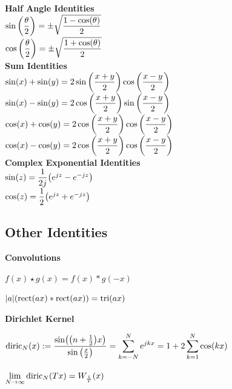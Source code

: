 \documentclass[11pt]{article}
\begin{document}
\begin{multicols}{2}
  \textbf{Half Angle Identities}\\
  \(\sin{\left( \dfrac{\theta}{2} \right)} = \pm \sqrt{\dfrac{1 - \cos(\theta)}{2}}\) \vspace{6pt}\\
  \(\cos{\left( \dfrac{\theta}{2} \right)} = \pm \sqrt{\dfrac{1 + \cos(\theta)}{2}}\) \vspace{6pt}\\

  \textbf{Sum Identities}\\
  \(\sin(x) + \sin(y) = 2\sin{\left( \dfrac{x + y}{2} \right)}\cos{\left( \dfrac{x - y}{2} \right)}\) \vspace{10pt}\\
  \(\sin(x) - \sin(y) = 2\cos{\left( \dfrac{x + y}{2} \right)}\sin{\left( \dfrac{x - y}{2} \right)}\) \vspace{10pt}\\
  \(\cos(x) + \cos(y) = 2\cos{\left( \dfrac{x + y}{2} \right)}\cos{\left( \dfrac{x - y}{2} \right)}\) \vspace{10pt}\\
  \(\cos(x) - \cos(y) = 2\cos{\left( \dfrac{x + y}{2} \right)}\cos{\left( \dfrac{x - y}{2} \right)}\) \vspace{10pt}\\
  \textbf{Complex Exponential Identities}\\
  \(\sin(z) = \dfrac{1}{2j}{\left( e^{jz} - e ^{-jz} \right)}\)\vspace{6pt}\\
  \(\cos(z) = \dfrac{1}{2}{\left( e^{jz} + e ^{-jz} \right)}\)
  \end{multicols}

  \pagebreak

  \subsection{Other Identities}


  \textbf{Convolutions}

  \(f(x) \star g(x) = f(x) * g(-x)\)

  \(|a|(\mathrm{rect}(ax) * \mathrm{rect}(ax)) = \mathrm{tri}(ax)\)

  \vspace{12pt}

  \textbf{Dirichlet Kernel}

  \(\displaystyle
  \mathrm{diric}_N(x) := \dfrac{\sin({\left( n + \frac{1}{2} \right)}x)}{\sin{\left( \frac{x}{2} \right)}} =
  \sum_{k = -N}^{N} e^{jkx} =
  1 + 2\sum_{k = 1}^N\cos(kx)\)

  \(\displaystyle \lim_{N \to \infty} \mathrm{diric}_{N}(Tx) = W_{\frac{1}{T}}(x)\)
\end{document}
